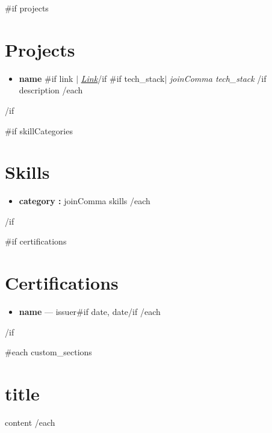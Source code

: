 \documentclass[10pt,a4paper]{article}
\newcommand{\resumeItem}[1]{\item\small{#1}}
\begin{document}
{{#if projects}}
\section{Projects}
\begin{itemize}[leftmargin=0.15in, label={}]
{{#each projects}}
  \item
  \textbf{ {{name}} }
  {{#if link}} $|$ \href{ {{link}} }{\small\textit{Link}}{{/if}}
  {{#if tech_stack}}$|$ \small\textit{ {{joinComma tech_stack}} }{{/if}}\\
  \small{{description}}
{{/each}}
\end{itemize}
{{/if}}

{{#if skillCategories}}
\section{Skills}
\begin{itemize}[leftmargin=0.15in, label={}]
{{#each skillCategories}}
  \item \textbf{ {{category}} :} {{joinComma skills}}
{{/each}}
\end{itemize}
{{/if}}

{{#if certifications}}
\section{Certifications}
\begin{itemize}[leftmargin=0.15in, label=\textbullet]
{{#each certifications}}
  \resumeItem{\textbf{ {{name}} } --- {{issuer}}{{#if date}}, {{date}}{{/if}} }
{{/each}}
\end{itemize}
{{/if}}

{{#each custom_sections}}
\section{ {{title}} }
{{content}}
{{/each}}

\end{document}
